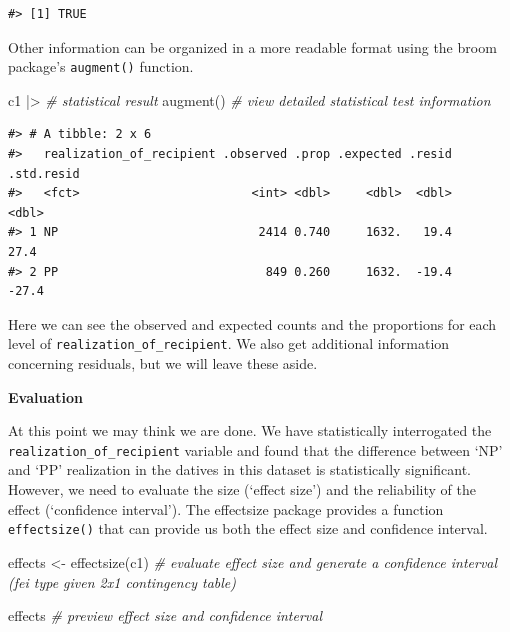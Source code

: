 \documentclass[
  letterpaper,
]{latex/krantz}
\newenvironment{Shaded}{\begin{snugshade}}{\end{snugshade}}
\newcommand{\CommentTok}[1]{\textcolor[rgb]{0.00,0.00,0.00}{\textit{#1}}}
\newcommand{\FunctionTok}[1]{\textcolor[rgb]{0.00,0.00,0.00}{#1}}
\newcommand{\NormalTok}[1]{\textcolor[rgb]{0.00,0.00,0.00}{#1}}
\newcommand{\OtherTok}[1]{\textcolor[rgb]{0.00,0.00,0.00}{#1}}
\newcommand{\SpecialCharTok}[1]{\textcolor[rgb]{0.00,0.00,0.00}{#1}}
\begin{document}
\begin{verbatim}
#> [1] TRUE
\end{verbatim}

Other information can be organized in a more readable format using the
broom package's \texttt{augment()} function.

\begin{Shaded}
\begin{Highlighting}[]
\NormalTok{c1 }\SpecialCharTok{|\textgreater{}} \CommentTok{\# statistical result}
  \FunctionTok{augment}\NormalTok{() }\CommentTok{\# view detailed statistical test information}
\end{Highlighting}
\end{Shaded}

\begin{verbatim}
#> # A tibble: 2 x 6
#>   realization_of_recipient .observed .prop .expected .resid .std.resid
#>   <fct>                        <int> <dbl>     <dbl>  <dbl>      <dbl>
#> 1 NP                            2414 0.740     1632.   19.4       27.4
#> 2 PP                             849 0.260     1632.  -19.4      -27.4
\end{verbatim}

Here we can see the observed and expected counts and the proportions for
each level of \texttt{realization\_of\_recipient}. We also get
additional information concerning residuals, but we will leave these
aside.

\textbf{Evaluation}

At this point we may think we are done. We have statistically
interrogated the \texttt{realization\_of\_recipient} variable and found
that the difference between `NP' and `PP' realization in the datives in
this dataset is statistically significant. However, we need to evaluate
the size (`effect size') and the reliability of the effect (`confidence
interval'). The effectsize package provides a function
\texttt{effectsize()} that can provide us both the effect size and
confidence interval.

\begin{Shaded}
\begin{Highlighting}[]
\NormalTok{effects }\OtherTok{\textless{}{-}} 
  \FunctionTok{effectsize}\NormalTok{(c1) }\CommentTok{\# evaluate effect size and generate a confidence interval (fei type given 2x1 contingency table)}

\NormalTok{effects }\CommentTok{\# preview effect size and confidence interval}
\end{Highlighting}
\end{Shaded}
\end{document}
